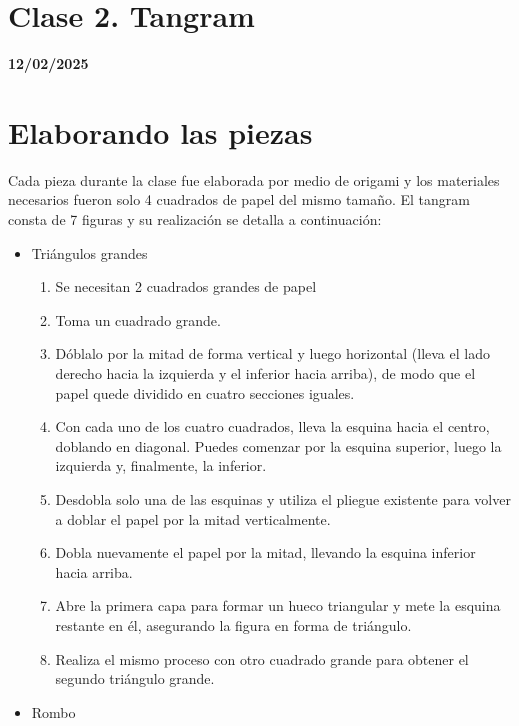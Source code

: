 \section{Clase 2. Tangram}
\textbf{12/02/2025}
\section{Elaborando las piezas}

Cada pieza durante la clase fue elaborada por medio de origami y los materiales necesarios fueron solo 4 cuadrados de papel del mismo tamaño. El tangram consta de 7 figuras y su realización se detalla a continuación:

\begin{itemize}
    
    \item Triángulos grandes
    \begin{enumerate}

        \item  Se necesitan 2 cuadrados grandes de papel
        \item Toma un cuadrado grande.  
        \item Dóblalo por la mitad de forma vertical y luego horizontal (lleva el lado derecho hacia la izquierda y el inferior hacia arriba), de modo que el papel quede dividido en cuatro secciones iguales.  
        \item Con cada uno de los cuatro cuadrados, lleva la esquina hacia el centro, doblando en diagonal. Puedes comenzar por la esquina superior, luego la izquierda y, finalmente, la inferior.  
        \item Desdobla solo una de las esquinas y utiliza el pliegue existente para volver a doblar el papel por la mitad verticalmente.  
        \item Dobla nuevamente el papel por la mitad, llevando la esquina inferior hacia arriba.  
        \item Abre la primera capa para formar un hueco triangular y mete la esquina restante en él, asegurando la figura en forma de triángulo.  
        \item Realiza el mismo proceso con otro cuadrado grande para obtener el segundo triángulo grande.
        
    \end{enumerate}

    \item Rombo
    \begin{enumerate}


\end{enumerate}
\end{itemize}
